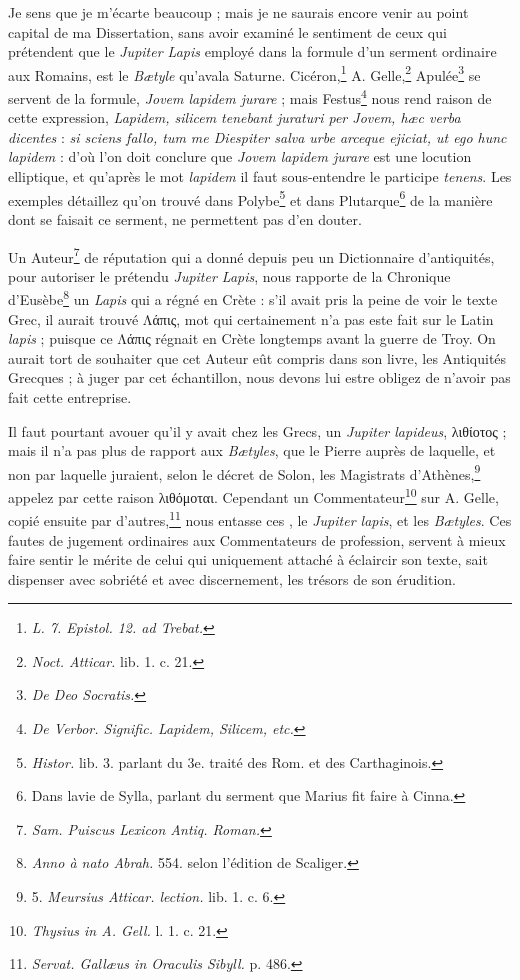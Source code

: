 \documentclass[a4paper, 11pt, oneside, polutonikogreek, french, landscape]{article}
\begin{document}
Je sens que je m'écarte beaucoup ; mais je ne saurais encore venir au point capital de ma Dissertation, sans avoir examiné le sentiment de ceux qui prétendent que le \emph{Jupiter Lapis} employé dans la formule d'un serment ordinaire aux Romains, est le \emph{Bætyle} qu'avala Saturne. Cicéron,\footnote{\emph{L. 7. Epistol. 12. ad Trebat.}} A. Gelle,\footnote{\emph{Noct. Atticar.} lib. 1. c. 21.} Apulée\footnote{\emph{De Deo Socratis.}} se servent de la formule, \emph{Jovem lapidem jurare} ; mais Festus\footnote{\emph{De Verbor. Signific. Lapidem, Silicem, etc.}} nous rend raison de cette expression, \emph{Lapidem, silicem tenebant juraturi per Jovem, hæc verba dicentes} : \emph{si sciens fallo, tum me Diespiter salva urbe arceque ejiciat, ut ego hunc lapidem} : d'où l'on doit conclure que \emph{Jovem lapidem jurare} est une locution elliptique, et qu'après le mot \emph{lapidem} il faut sous-entendre le participe \emph{tenens}. Les exemples détaillez qu'on trouvé dans Polybe\footnote{\emph{Histor.} lib. 3. parlant du 3e. traité des Rom. et des Carthaginois.} et dans Plutarque\footnote{Dans lavie de Sylla, parlant du serment que Marius fit faire à Cinna.} de la manière dont se faisait ce serment, ne permettent pas d'en douter.

Un Auteur\footnote{\emph{Sam. Puiscus Lexicon Antiq. Roman.}} de réputation qui a donné depuis peu un Dictionnaire d'antiquités, pour autoriser le prétendu \emph{Jupiter Lapis}, nous rapporte de la Chronique d'Eusèbe\footnote{\emph{Anno à nato Abrah.} 554. selon l'édition de Scaliger.} un \emph{Lapis} qui a régné en Crète : s'il avait pris la peine de voir le texte Grec, il aurait trouvé Λάπις, mot qui certainement n'a pas este fait sur le Latin \emph{lapis} ; puisque ce Λάπις régnait en Crète longtemps avant la guerre de Troy. On aurait tort de souhaiter que cet Auteur eût compris dans son livre, les Antiquités Grecques ; à juger par cet échantillon, nous devons lui estre obligez de n'avoir pas fait cette entreprise.

Il faut pourtant avouer qu'il y avait chez les Grecs, un \emph{Jupiter lapideus}, λιθίοτος ; mais il n'a pas plus de rapport aux \emph{Bætyles}, que le Pierre auprès de laquelle, et non par laquelle juraient, selon le décret de Solon, les Magistrats d'Athènes,\footnote{5. \emph{Meursius Atticar. lection.} lib. 1. c. 6.} appelez par cette raison λιθόμοται. Cependant un Commentateur\footnote{\emph{Thysius in A. Gell.} l. 1. c. 21.} sur A. Gelle, copié ensuite par d'autres,\footnote{\emph{Servat. Gallæus in Oraculis Sibyll.} p. 486.} nous entasse ces , le \emph{Jupiter lapis}, et les \emph{Bætyles}. Ces fautes de jugement ordinaires aux Commentateurs de profession, servent à mieux faire sentir le mérite de celui qui uniquement attaché à éclaircir son texte, sait dispenser avec sobriété et avec discernement, les trésors de son érudition.
\end{document}
